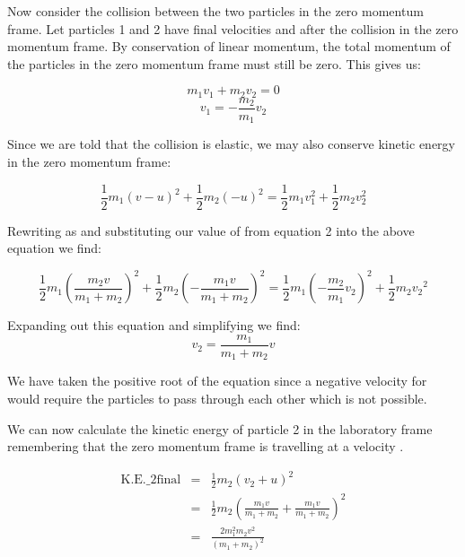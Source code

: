 \begin{problem}
{Now consider the collision between the two particles in the zero momentum frame. Let particles 1 and 2 have final velocities  and  after the collision in the zero momentum frame. By conservation of linear momentum, the total momentum of the particles in the zero momentum frame must still be zero. This gives us:

\begin{equation*}
m_1 v_1 + m_2 v_2 = 0
\end{equation*}
\begin{equation}
v_1=-\frac{m_2}{m_1} v_2
\end{equation}

Since we are told that the collision is elastic, we may also conserve kinetic energy in the zero momentum frame:

\begin{equation*}
\frac{1}{2}m_1 (v-u)^2+\frac{1}{2}m_2(-u)^2 = \frac{1}{2}m_1 v_1^2+\frac{1}{2}m_2 v_2^2
\end{equation*}

Rewriting  as  and substituting our value of  from equation 2 into the above equation we find:

\begin{equation*}
\frac{1}{2}m_1 \left(\frac{m_2 v}{m_1 + m_2}\right)^2+\frac{1}{2}m_2\left(-\frac{m_1 v}{m_1 + m_2}\right)^2 = \frac{1}{2}m_1\left(-\frac{m_2}{m_1}v_2\right)^2+\frac{1}{2} m_2{v_2}^2
\end{equation*}

Expanding out this equation and simplifying we find:
\begin{equation*}
v_2 = \frac{m_1}{m_1 + m_2}v
\end{equation*}

We have taken the positive root of the equation since a negative velocity for  would require the particles to pass through each other which is not possible. 

We can now calculate the kinetic energy of particle 2 in the laboratory frame remembering that the zero momentum frame is travelling at a velocity .

\begin{eqnarray*}
\text{K.E._{2final}} &=& \frac{1}{2}m_2\left(v_2 + u\right)^2 \\
 &=& \frac{1}{2}m_2\left(\frac{m_1v}{m_1 + m_2}+ \frac{m_1 v}{m_1 + m_2}\right)^2 \\
 &=& \frac{2 m_1^2 m_2 v^2}{\left(m_1 + m_2\right)^2}
\end{eqnarray*}

}
\end{problem}
